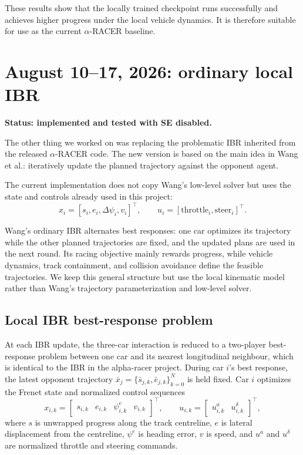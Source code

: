\documentclass[11pt]{article}
\newcommand{\status}[1]{\textcolor{blue!65!black}{\textbf{#1}}}
\begin{document}
These results show that the locally trained checkpoint runs successfully and
achieves higher progress under the local vehicle dynamics. It is therefore
suitable for use as the current $\alpha$-RACER baseline. 

\section{August 10--17, 2026: ordinary local IBR}

\status{Status: implemented and tested with SE disabled.}

The other thing we worked on was replacing the problematic IBR inherited from
the released $\alpha$-RACER code. The new version is based on the main idea in Wang et al.: iteratively update the planned trajectory against the opponent agent.

The current implementation does not copy Wang's low-level
solver but uses the state and controls already used in this project:
\[
  x_i=[s_i,e_i,\Delta\psi_i,v_i]^\top,
  \qquad
  u_i=[\text{throttle}_i,\text{steer}_i]^\top.
\]

Wang's ordinary IBR alternates best responses: one car optimizes its trajectory
while the other planned trajectories are fixed, and the updated plans are used
in the next round. Its racing objective mainly rewards progress, while vehicle
dynamics, track containment, and collision avoidance define the feasible
trajectories. We keep this general structure but use the local kinematic model
rather than Wang's trajectory parameterization and low-level solver.

\subsection{Local IBR best-response problem}

At each IBR update, the three-car interaction is reduced to a two-player
best-response problem between one car and its nearest longitudinal neighbour, which is identical to the IBR in the alpha-racer project.
During car $i$'s best response, the latest opponent trajectory
$\bar x_j=\{\bar s_{j,k},\bar e_{j,k}\}_{k=0}^{N}$ is held fixed. Car $i$
optimizes the Frenet state and normalized control sequences
\[
  x_{i,k}=
  \begin{bmatrix}
    s_{i,k} & e_{i,k} & \psi_{i,k}^{e} & v_{i,k}
  \end{bmatrix}^{\top},
  \qquad
  u_{i,k}=
  \begin{bmatrix}
    u_{i,k}^{a} & u_{i,k}^{\delta}
  \end{bmatrix}^{\top},
\]
where $s$ is unwrapped progress along the track centreline, $e$ is lateral
displacement from the centreline, $\psi^e$ is heading error, $v$ is speed, and
$u^a$ and $u^\delta$ are normalized throttle and steering commands.
\end{document}
